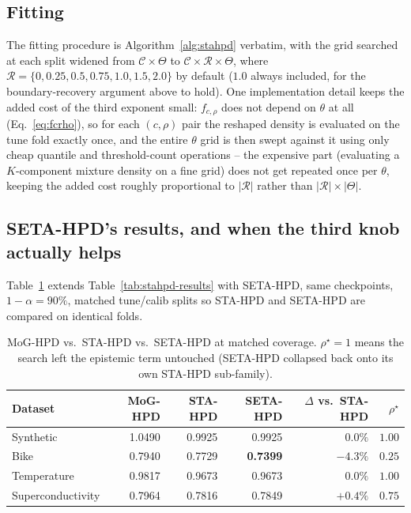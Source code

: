 \documentclass[11pt]{article}
\begin{document}
\subsection{Fitting}

The fitting procedure is Algorithm~\ref{alg:stahpd} verbatim, with the grid searched at each split
widened from $\mathcal C\times\Theta$ to $\mathcal C\times\mathcal R\times\Theta$, where $\mathcal
R = \{0,0.25,0.5,0.75,1.0,1.5,2.0\}$ by default ($1.0$ always included, for the boundary-recovery
argument above to hold). One implementation detail keeps the added cost of the third exponent
small: $f_{c,\rho}$ does not depend on $\theta$ at all (Eq.~\ref{eq:fcrho}), so for each $(c,\rho)$
pair the reshaped density is evaluated on the tune fold exactly once, and the entire $\theta$ grid
is then swept against it using only cheap quantile and threshold-count operations -- the expensive
part (evaluating a $K$-component mixture density on a fine grid) does not get repeated once per
$\theta$, keeping the added cost roughly proportional to $|\mathcal R|$ rather than $|\mathcal
R|\times|\Theta|$.

\subsection{SETA-HPD's results, and when the third knob actually helps}
\label{sec:setaresults}

Table~\ref{tab:setaresults} extends Table~\ref{tab:stahpd-results} with SETA-HPD, same checkpoints,
$1-\alpha=90\%$, matched tune/calib splits so STA-HPD and SETA-HPD are compared on identical folds.

\begin{table}[h]
\centering
\caption{MoG-HPD vs.\ STA-HPD vs.\ SETA-HPD at matched coverage. $\rho^\star=1$ means the search
left the epistemic term untouched (SETA-HPD collapsed back onto its own STA-HPD sub-family).}
\label{tab:setaresults}
\begin{tabular}{@{}lrrrrr@{}}
\toprule
\textbf{Dataset} & \textbf{MoG-HPD} & \textbf{STA-HPD} & \textbf{SETA-HPD} & $\Delta$ vs.\ STA-HPD
& $\rho^\star$ \\
\midrule
Synthetic & 1.0490 & 0.9925 & 0.9925 & $0.0\%$ & $1.00$ \\
Bike & 0.7940 & 0.7729 & \textbf{0.7399} & $-4.3\%$ & $0.25$ \\
Temperature & 0.9817 & 0.9673 & 0.9673 & $0.0\%$ & $1.00$ \\
Superconductivity & 0.7964 & 0.7816 & 0.7849 & $+0.4\%$ & $0.75$ \\
\bottomrule
\end{tabular}
\end{table}
\end{document}
